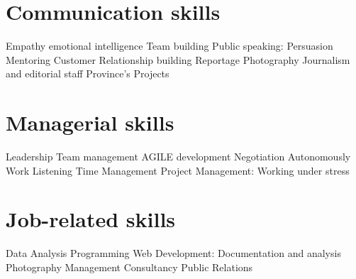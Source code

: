 \documentclass[]{friggeri-cv}
\begin{document}
\begin{aside}
\section{Communication skills}
    Empathy
    emotional intelligence
    Team building
    Public speaking:
    Persuasion
    Mentoring
    Customer Relationship building
    Reportage Photography
    Journalism and editorial staff
    Province’s Projects
\section{Managerial skills}
    Leadership
    Team management
    AGILE development
    Negotiation
    Autonomously Work
    Listening
    Time Management
    Project Management:
    Working under stress
\section{Job-related skills}
    Data Analysis
    Programming
    Web Development:
    Documentation and analysis
    Photography
    Management
    Consultancy
    Public Relations
\end{aside}
\end{document}
